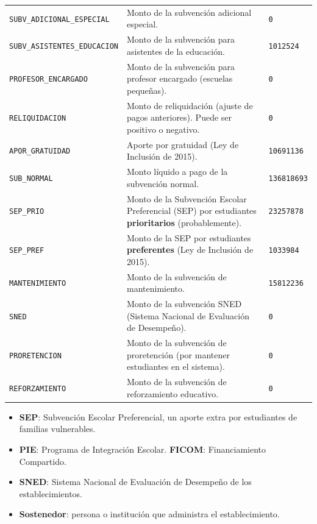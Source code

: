 \documentclass[10.5pt]{article}
\begin{document}
\begin{xltabular}{\linewidth}{@{}p{4.5cm} >{\raggedright\arraybackslash}X p{3.4cm}@{}}
\texttt{SUBV\_\allowbreak{}ADICIONAL\_\allowbreak{}ESPECIAL} & Monto de la subvención adicional especial. & \texttt{0} \\
\texttt{SUBV\_\allowbreak{}ASISTENTES\_\allowbreak{}EDUCACION} & Monto de la subvención para asistentes de la educación. & \texttt{1012524} \\
\texttt{PROFESOR\_\allowbreak{}ENCARGADO} & Monto de la subvención para profesor encargado (escuelas pequeñas). & \texttt{0} \\
\texttt{RELIQUIDACION} & Monto de reliquidación (ajuste de pagos anteriores). Puede ser positivo o negativo. & \texttt{0} \\
\texttt{APOR\_\allowbreak{}GRATUIDAD} & Aporte por gratuidad (Ley de Inclusión de 2015). & \texttt{10691136} \\
\texttt{SUB\_\allowbreak{}NORMAL} & Monto líquido a pago de la subvención normal. & \texttt{136818693} \\
\texttt{SEP\_\allowbreak{}PRIO} & Monto de la Subvención Escolar Preferencial (SEP) por estudiantes \textbf{prioritarios} (probablemente). & \texttt{23257878} \\
\texttt{SEP\_\allowbreak{}PREF} & Monto de la SEP por estudiantes \textbf{preferentes} (Ley de Inclusión de 2015). & \texttt{1033984} \\
\texttt{MANTENIMIENTO} & Monto de la subvención de mantenimiento. & \texttt{15812236} \\
\texttt{SNED} & Monto de la subvención SNED (Sistema Nacional de Evaluación de Desempeño). & \texttt{0} \\
\texttt{PRORETENCION} & Monto de la subvención de proretención (por mantener estudiantes en el sistema). & \texttt{0} \\
\texttt{REFORZAMIENTO} & Monto de la subvención de reforzamiento educativo. & \texttt{0} \\
\end{xltabular}

\begin{formulabox}
\begin{itemize}[leftmargin=1.1em,itemsep=2pt,topsep=2pt]
\item \textbf{SEP}: Subvención Escolar Preferencial, un aporte extra por estudiantes de familias vulnerables.
\item \textbf{PIE}: Programa de Integración Escolar.  \textbf{FICOM}: Financiamiento Compartido.
\item \textbf{SNED}: Sistema Nacional de Evaluación de Desempeño de los establecimientos.
\item \textbf{Sostenedor}: persona o institución que administra el establecimiento.
\end{itemize}
\end{formulabox}
\end{document}
